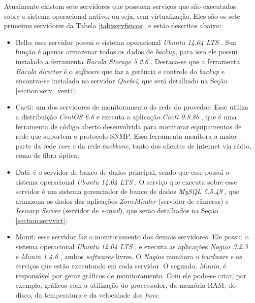 Atualmente existem sete servidores que possuem serviços que são executados sobre o sistema operacional nativo, ou seja, sem virtualização. 
Eles são os sete primeiros servidores da Tabela \ref{tab:servfisicos}, e estão descritos abaixo:
\begin{itemize}
 \item Bello: esse servidor possui o sistema operacional \textit{Ubuntu 14.04 \ac{LTS}} \cite{ubuntu}. Sua função é apenas armazenar todos os 
 dados de \textit{backup}, para isso ele possui instalado a ferramenta \textit{Bacula Storage 5.2.6} \cite{bacula}. Destaca-se que a ferramenta 
 \textit{Bacula director} é o \textit{software} que faz a gerência e controle do \textit{backup} e encontra-se instalado no servidor 
 \textit{Quebei}, que será detalhado na Seção \ref{section:serv_venti};
 
 \item Cacti: um dos servidores de monitoramento da rede do provedor. Esse utiliza a distribuição \textit{CentOS 6.6} \cite{centos} e executa a 
 aplicação \textit{Cacti 0.8.8b} \cite{cacti}, que é uma ferramenta de código aberto desenvolvida para monitorar equipamentos de rede que 
 suportem o protocolo \ac{SNMP}. Essa ferramenta monitora a maior parte da rede \textit{core} e da rede \textit{backbone}, tanto dos clientes de 
 internet via rádio, como de fibra óptica;
 
 \item Dati: é o servidor de banco de dados principal, sendo que esse possui o sistema operacional \textit{Ubuntu 14.04 \ac{LTS}} \cite{ubuntu}. 
 O serviço que executa sobre esse servidor é um sistema gerenciador de banco de dados \textit{MySQL 5.5.49} \cite{mysql}, que armazena os dados 
 das aplicações \textit{ZoneMinder} \cite{zoneminder} (servidor de câmeras) e \textit{Icewarp Server} \cite{icewarp} (servidor de \textit{e-mail}), 
 que serão detalhados na Seção \ref{section:servvirt};
 
 \item Monit: esse servidor faz o monitoramento dos demais servidores. Ele possui o sistema operacional \textit{Ubuntu 12.04 \ac{LTS}} 
 \cite{ubuntu}, e executa as aplicações \textit{Nagios 3.2.3} \cite{nagios} e \textit{Munin 1.4.6} \cite{munin}, ambos \textit{softwares} livres. 
 O \textit{Nagios} monitora o \textit{hardware} e os serviços que estão executando em cada servidor. O segundo, \textit{Munin}, é responsável por 
 gerar gráficos de monitoramento. Com ele pode-se criar, por exemplo, gráficos com a utilização do processador, da memória RAM, do disco, da 
 temperatura e da velocidade dos \textit{fans};
 

\end{itemize}
